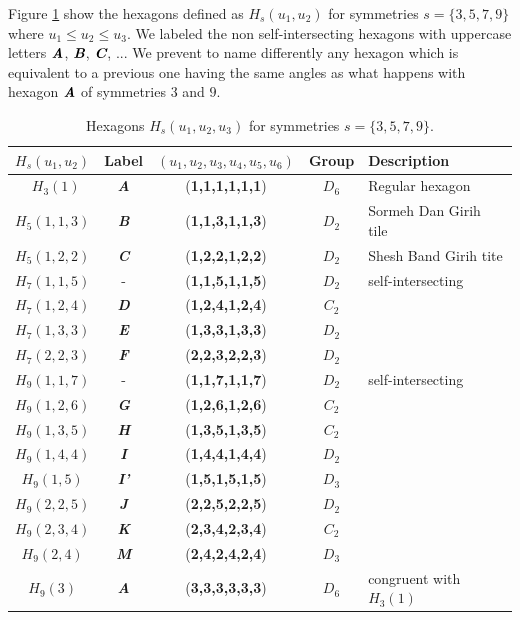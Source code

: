 \documentclass[11pt]{article}
\def\mathbi#1{\textbf{\em #1}}
\begin{document}
Figure \ref{tbl:hexagons-angles} show the hexagons defined as $H_s(u_1,u_2)$ for symmetries $s = \{3,5,7,9\}$ where $u_1 \leq u_2 \leq u_3$. We labeled the non self-intersecting hexagons with uppercase letters $\mathbi{A}$, $\mathbi{B}$, $\mathbi{C}$, ... We prevent to name differently any hexagon which is equivalent to a previous one having the same angles as what happens with hexagon $\mathbi{A}$ of symmetries $3$ and $9$.

\begin{table}[H]
\begin{center}
\begin{tabular}{| c | c | c | c | l | }
\hline
$H_s(u_1,u_2)$ & Label & $(u_1,u_2,u_3,u_4,u_5,u_6)$ & Group & Description \\ \hline\
$H_3(1)$   & \mathbi{A} & (\textbf{1,1,1,1,1,1}) & $D_6$ & Regular hexagon \\[0.5ex]
\hline
$H_5(1,1,3)$ & \mathbi{B} & (\textbf{1,1,3,1,1,3}) & $D_2$ & Sormeh Dan Girih tile\\[0.5ex]
$H_5(1,2,2)$ & \mathbi{C} & (\textbf{1,2,2,1,2,2}) & $D_2$ & Shesh Band Girih tite\\[0.5ex]
\hline
$H_7(1,1,5)$ & -          & (\textbf{1,1,5,1,1,5}) & $D_2$ & self-intersecting \\[0.5ex]
$H_7(1,2,4)$ & \mathbi{D} & (\textbf{1,2,4,1,2,4}) & $C_2$ & \\[0.5ex]
$H_7(1,3,3)$ & \mathbi{E} & (\textbf{1,3,3,1,3,3}) & $D_2$ & \\[0.5ex]
$H_7(2,2,3)$ & \mathbi{F} & (\textbf{2,2,3,2,2,3}) & $D_2$ & \\[0.5ex]
\hline
$H_9(1,1,7)$ & -           & (\textbf{1,1,7,1,1,7}) & $D_2$ & self-intersecting \\[0.5ex]
$H_9(1,2,6)$ & \mathbi{G}  & (\textbf{1,2,6,1,2,6}) & $C_2$ & \\[0.5ex]
$H_9(1,3,5)$ & \mathbi{H}  & (\textbf{1,3,5,1,3,5}) & $C_2$ & \\[0.5ex]
$H_9(1,4,4)$ & \mathbi{I}  & (\textbf{1,4,4,1,4,4}) & $D_2$ & \\[0.5ex]
$H_9(1,5)$   & \mathbi{I'} & (\textbf{1,5,1,5,1,5}) & $D_3$ & \\[0.5ex]
$H_9(2,2,5)$ & \mathbi{J}  & (\textbf{2,2,5,2,2,5}) & $D_2$ & \\[0.5ex]
$H_9(2,3,4)$ & \mathbi{K}  & (\textbf{2,3,4,2,3,4}) & $C_2$ & \\[0.5ex]
$H_9(2,4)$   & \mathbi{M} & (\textbf{2,4,2,4,2,4}) & $D_3$ & \\[0.5ex]
$H_9(3)$     & \mathbi{A} & (\textbf{3,3,3,3,3,3}) & $D_6$  & congruent with $H_3(1)$\\[0.5ex]
\hline
\end{tabular}
\caption{Hexagons $H_s(u_1,u_2,u_3)$ for symmetries $s = \{3,5,7,9\}$.} 
\label{tbl:hexagons-angles}
\end{center}
\end{table}
\end{document}
